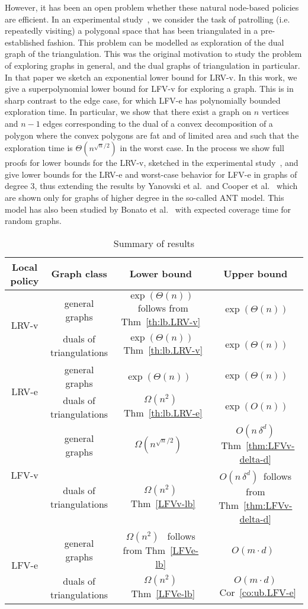 However, it has been an open problem whether these natural node-based policies
are efficient. In an experimental study~\cite{mlf+-lpeptr-15}, we consider the task of patrolling
(i.e. repeatedly visiting) a
polygonal space that has been triangulated in a pre-established fashion.
This problem can be modelled as exploration of the dual graph of the triangulation.
This was the original motivation to study the problem of exploring graphs
in general, and the dual graphs of triangulation in particular.
In that paper we sketch an exponential lower
bound for LRV-v.
In this work, we give a superpolynomial lower bound for
LFV-v for exploring a graph. This is in sharp contrast to the edge case,
for which LFV-e has polynomially bounded exploration time. In particular,
we show that there exist a graph on $n$ vertices and $n-1$ edges corresponding to the dual of
a convex
decomposition of a polygon where the convex polygons are fat and of limited area and
such that the exploration time is $\Theta(n^{\sqrt{n}/2} )$ in the worst case.
In the process we show full proofs for
lower bounds for the LRV-v, sketched in the experimental study~\cite{mlf+-lpeptr-15},
and give lower bounds for the LRV-e and worst-case behavior for LFV-e in graphs of degree 3,
thus extending the results by Yanovski et al.~and Cooper et al.~\cite{cik+-drwug-11,yvb+-algo-03} which are shown only
for graphs of higher degree in the so-called ANT model. This model has also been studied by Bonato et al.~\cite{b+-waw-15}
with expected coverage time for random graphs.

\begin{table}[h]
\caption{Summary of results}
\centering
\begin{tabular}{|c|c|c|c|}
  \hline
Local policy & Graph class & Lower bound & Upper bound \\
   \hline
   \multirow{2}{*}{LRV-v} & general graphs  & $\exp(\Theta(n))$~follows from  Thm~\ref{th:lb.LRV-v} & $\exp(\Theta(n))$ \\
   & duals of triangulations & $\exp(\Theta(n))$~Thm~\ref{th:lb.LRV-v} & $\exp(\Theta(n))$ \\
   \hline
  \multirow{2}{*}{LRV-e} & general graphs  & $\exp(\Theta(n))$~\cite{cik+-drwug-11} & $\exp(\Theta(n))$\\
  & duals of triangulations & $\Omega(n^2)$~Thm~\ref{th:lb.LRV-e} & $\exp(O(n))$ \\
  \hline
  \multirow{2}{*}{LFV-v} & general graphs & $\Omega(n^{\sqrt{n}/2})$~\cite{ksl+-ants-01,mcvw+-distr-05} & $O(n\,\delta^d)$~Thm~\ref{thm:LFVv-delta-d}\\
   & duals of triangulations & $\Omega(n^2)$~Thm~\ref{LFVv-lb} &  $O(n\,\delta^d)$~follows from Thm~\ref{thm:LFVv-delta-d}\\
  \hline
  \multirow{2}{*}{LFV-e} & general graphs & $\Omega(n^2)$ ~follows from  Thm~\ref{LFVe-lb}& $O(m\cdot d)$~\cite{cik+-drwug-11} \\
   & duals of triangulations & $\Omega(n^2)$~Thm~\ref{LFVe-lb} & $O(m\cdot d)$~Cor~\ref{co:ub.LFV-e} \\
   \hline
\end{tabular}
\label{table:results}
\end{table}

